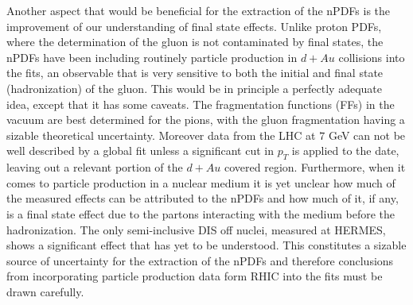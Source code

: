 \documentclass[twocolumn]{revtex4}
\begin{document}
Another aspect that would be beneficial for the extraction of the nPDFs is the improvement of our understanding of final state effects. Unlike proton PDFs, where the determination of the gluon is not contaminated by final states, the nPDFs have been including routinely particle production in $d+Au$ collisions into the fits, an observable that is very sensitive to both the initial and final state (hadronization) of the gluon. This would be in principle a perfectly adequate idea, except that it has some caveats. The fragmentation functions (FFs) in the vacuum are best determined for the pions, with the gluon fragmentation having a sizable theoretical uncertainty. Moreover data from the LHC at $7$ GeV can not be well described by a global fit unless a significant cut in $p_{T}$ is applied to the date, leaving out a relevant portion of the $d+Au$ covered region. Furthermore, when it comes to particle production in a nuclear medium it is yet unclear how much of the measured effects can be attributed to the nPDFs and how much of it, if any, is a final state effect due to the partons interacting with the medium before the hadronization. The only semi-inclusive DIS off nuclei, measured at HERMES, shows a significant effect that has yet to be understood. This constitutes a sizable source of uncertainty for the extraction of the nPDFs and therefore conclusions from incorporating particle production data form RHIC into the fits must be drawn carefully.   

\begin{thebibliography}{5}


\end{thebibliography}
\end{document}
